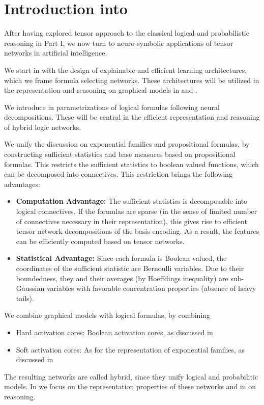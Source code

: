 \chapter{Introduction into }

After having explored tensor approach to the classical logical and probabilistic reasoning in Part I, we now turn to neuro-symbolic applications of tensor networks in artificial intelligence.

We start in  with the design of explainable and efficient learning architectures, which we frame formula selecting networks.
These architectures will be utilized in the representation and reasoning on graphical models in  and .


We introduce in  parametrizations of logical formulas following neural decompositions.
These will be central in the efficient representation and reasoning of hybrid logic networks.


We unify the discussion on exponential families and propositional formulas, by constructing sufficient statistics and base measures based on propositional formulas.
This restricts the sufficient statistics to boolean valued functions, which can be decomposed into connectives.
This restriction brings the following advantages:
\begin{itemize}
	\item \textbf{Computation Advantage:} The sufficient statistics is decomposable into logical connectives.
	If the formulas are sparse (in the sense of limited number of connectives necessary in their representation), this gives rise to efficient tensor network decompositions of the basis encoding.
    As a result, the features can be efficiently computed based on tensor networks.
    \item \textbf{Statistical Advantage:} Since each formula is Boolean valued, the coordinates of the sufficient statistic are Bernoulli variables.
	Due to their boundedness, they and their averages (by Hoeffdings inequality) are sub-Gaussian variables with favorable concentration properties (absence of heavy tails).
\end{itemize}

We combine graphical models with logical formulas, by combining
\begin{itemize}
    \item Hard activation cores: Boolean activation cores, as discussed in 
    \item Soft activation cores: As for the representation of exponential families, as discussed in 
\end{itemize}
The resulting networks are called hybrid, since they unify logical and probabilitic models.
In  we focus on the representation properties of these networks and in  on reasoning.



